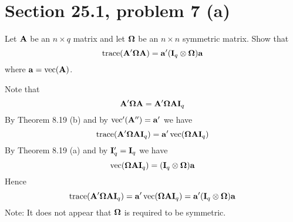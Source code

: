 \section{Section 25.1, problem 7 (a)}
Let $\bf A$ be an $n\times q$ matrix and let $\bf\Omega$ be an
$n\times n$ symmetric matrix.
Show that
$$\mathop{\rm trace}({\bf A}'{\bf\Omega}{\bf A})={\bf a}'({\bf I}_q
\otimes{\bf\Omega}){\bf a}$$
where ${\bf a}=\mathop{\rm vec}({\bf A})$.

\bigskip
\noindent
Note that
$${\bf A}'{\bf\Omega}{\bf A}={\bf A}'{\bf\Omega}{\bf A}{\bf I}_q$$
By Theorem 8.19 (b) and by
$\mathop{\rm vec}'({\bf A}'')={\bf a}'$ we have
$$\mathop{\rm trace}({\bf A}'{\bf\Omega}{\bf A}{\bf I}_q)
={\bf a}'\mathop{\rm vec}({\bf\Omega}{\bf A}{\bf I}_q)$$
By Theorem 8.19 (a) and by ${\bf I}'_q={\bf I}_q$ we have
$$\mathop{\rm vec}({\bf\Omega}{\bf A}{\bf I}_q)
=({\bf I}_q\otimes{\bf\Omega}){\bf a}$$
Hence
$$\mathop{\rm trace}({\bf A}'{\bf\Omega}{\bf A}{\bf I}_q)
={\bf a}'\mathop{\rm vec}({\bf\Omega}{\bf A}{\bf I}_q)
={\bf a}'({\bf I}_q
\otimes{\bf\Omega}){\bf a}$$
Note: It does not appear that $\bf\Omega$ is required to be symmetric.
